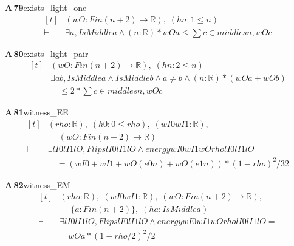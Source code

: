 \documentclass[conference]{IEEEtran}
\theoremstyle{definition}
\newcommand{\lean}[1]{\textsf{\footnotesize #1}}
\begin{document}
\noindent\textbf{A\,79}\quad\lean{exists\_light\_one}
{\footnotesize\[ \begin{aligned}[t]
&(\mathit{wO} : \mathit{Fin} (\mathit{n}+2) \to \mathbb{R} ),\; (\mathit{hn} : 1 \leq \mathit{n})\\
\vdash\;&\exists \mathit{a}, \mathit{IsMiddle} \mathit{a} \wedge (\mathit{n}:\mathbb{R} )*\mathit{wO} \mathit{a} \leq \textstyle\sum \mathit{c} \in \mathit{middles} \mathit{n}, \mathit{wO} \mathit{c}
\end{aligned} \]}

\noindent\textbf{A\,80}\quad\lean{exists\_light\_pair}
{\footnotesize\[ \begin{aligned}[t]
&(\mathit{wO} : \mathit{Fin} (\mathit{n}+2) \to \mathbb{R} ),\; (\mathit{hn} : 2 \leq \mathit{n})\\
\vdash\;&\exists \mathit{a} \mathit{b}, \mathit{IsMiddle} \mathit{a} \wedge \mathit{IsMiddle} \mathit{b} \wedge \mathit{a} \neq \mathit{b} \wedge (\mathit{n}:\mathbb{R} )*(\mathit{wO} \mathit{a} + \mathit{wO} \mathit{b})\\
&\quad \leq 2*\textstyle\sum \mathit{c} \in \mathit{middles} \mathit{n}, \mathit{wO} \mathit{c}
\end{aligned} \]}

\noindent\textbf{A\,81}\quad\lean{witness\_EE}
{\footnotesize\[ \begin{aligned}[t]
&(\mathit{rho} : \mathbb{R} ),\; (\mathit{h0} : 0 \leq \mathit{rho}),\; (\mathit{wI0} \mathit{wI1} : \mathbb{R} ),\\
&\quad \; (\mathit{wO} : \mathit{Fin} (\mathit{n}+2) \to \mathbb{R} )\\
\vdash\;&\exists \mathit{lI0} \mathit{lI1} \mathit{lO}, \mathit{Flips} \mathit{lI0} \mathit{lI1} \mathit{lO} \wedge \mathit{energy} \mathit{wI0} \mathit{wI1} \mathit{wO} \mathit{rho} \mathit{lI0} \mathit{lI1} \mathit{lO}\\
&\quad = (\mathit{wI0} + \mathit{wI1} + \mathit{wO} (\mathit{e0} \mathit{n}) + \mathit{wO} (\mathit{e1} \mathit{n}))*(1-\mathit{rho})^{2}/32
\end{aligned} \]}

\noindent\textbf{A\,82}\quad\lean{witness\_EM}
{\footnotesize\[ \begin{aligned}[t]
&(\mathit{rho} : \mathbb{R} ),\; (\mathit{wI0} \mathit{wI1} : \mathbb{R} ),\; (\mathit{wO} : \mathit{Fin} (\mathit{n}+2) \to \mathbb{R} ),\\
&\quad \; \{ \mathit{a} : \mathit{Fin} (\mathit{n}+2)\},\; (\mathit{ha} : \mathit{IsMiddle} \mathit{a})\\
\vdash\;&\exists \mathit{lI0} \mathit{lI1} \mathit{lO}, \mathit{Flips} \mathit{lI0} \mathit{lI1} \mathit{lO} \wedge \mathit{energy} \mathit{wI0} \mathit{wI1} \mathit{wO} \mathit{rho} \mathit{lI0} \mathit{lI1} \mathit{lO} =\\
&\quad \mathit{wO} \mathit{a}*(1-\mathit{rho}/2)^{2}/2
\end{aligned} \]}
\end{document}
